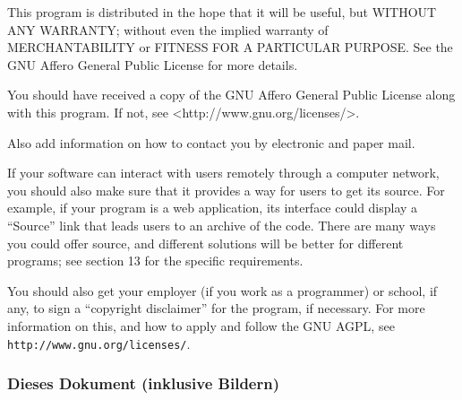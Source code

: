 \documentclass[10pt,a4paper,ngerman,titlepage,tocindentauto]{article}
\begin{document}
\begin{multicols}{3}
{\begin{enumerate}
						This program is distributed in the hope that it will be useful,
						but WITHOUT ANY WARRANTY; without even the implied warranty of
						MERCHANTABILITY or FITNESS FOR A PARTICULAR PURPOSE.  See the
						GNU Affero General Public License for more details.

						You should have received a copy of the GNU Affero General Public License
						along with this program.  If not, see <http://www.gnu.org/licenses/>.

						Also add information on how to contact you by electronic and paper mail.

						If your software can interact with users remotely through a computer
						network, you should also make sure that it provides a way for users to
						get its source.  For example, if your program is a web application, its
						interface could display a ``Source'' link that leads users to an archive
						of the code.  There are many ways you could offer source, and different
						solutions will be better for different programs; see section 13 for the
						specific requirements.

						You should also get your employer (if you work as a programmer) or
						school, if any, to sign a ``copyright disclaimer'' for the program, if
						necessary.  For more information on this, and how to apply and follow
						the GNU AGPL, see \texttt{http://www.gnu.org/licenses/}.

						\end{enumerate}
				}
			\end{multicols}
			
			\subsubsection[Dieses Dokument]{Dieses Dokument (inklusive Bildern)}
			
\end{document}
